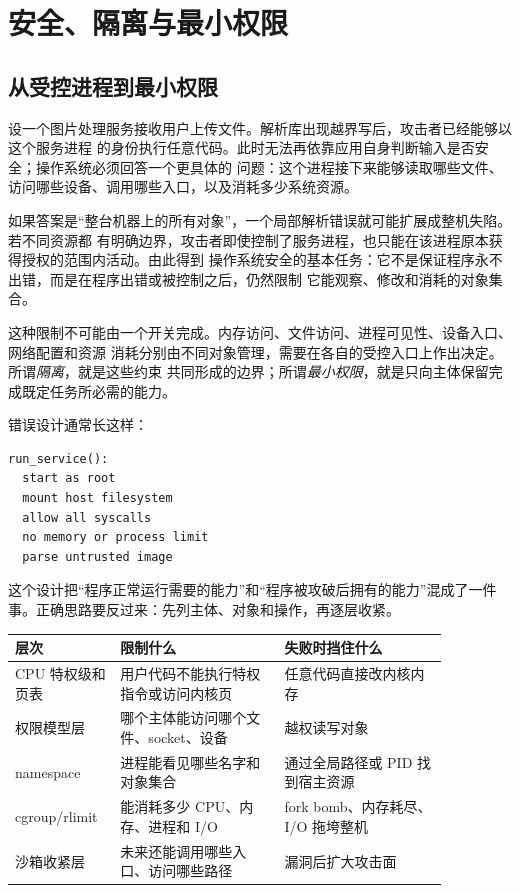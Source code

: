 \chapter{安全、隔离与最小权限}

\section{从受控进程到最小权限}

设一个图片处理服务接收用户上传文件。解析库出现越界写后，攻击者已经能够以这个服务进程
的身份执行任意代码。此时无法再依靠应用自身判断输入是否安全；操作系统必须回答一个更具体的
问题：这个进程接下来能够读取哪些文件、访问哪些设备、调用哪些入口，以及消耗多少系统资源。

如果答案是“整台机器上的所有对象”，一个局部解析错误就可能扩展成整机失陷。若不同资源都
有明确边界，攻击者即使控制了服务进程，也只能在该进程原本获得授权的范围内活动。由此得到
操作系统安全的基本任务：它不是保证程序永不出错，而是在程序出错或被控制之后，仍然限制
它能观察、修改和消耗的对象集合。

这种限制不可能由一个开关完成。内存访问、文件访问、进程可见性、设备入口、网络配置和资源
消耗分别由不同对象管理，需要在各自的受控入口上作出决定。所谓\emph{隔离}，就是这些约束
共同形成的边界；所谓\emph{最小权限}，就是只向主体保留完成既定任务所必需的能力。

错误设计通常长这样：

\begin{lstlisting}
run_service():
  start as root
  mount host filesystem
  allow all syscalls
  no memory or process limit
  parse untrusted image
\end{lstlisting}

这个设计把“程序正常运行需要的能力”和“程序被攻破后拥有的能力”混成了一件事。正确思路要反过来：先列主体、对象和操作，再逐层收紧。

\begin{longtable}{p{0.18\linewidth}p{0.34\linewidth}p{0.34\linewidth}}
\toprule
层次 & 限制什么 & 失败时挡住什么 \\
\midrule
CPU 特权级和页表 & 用户代码不能执行特权指令或访问内核页 & 任意代码直接改内核内存 \\
权限模型层 & 哪个主体能访问哪个文件、socket、设备 & 越权读写对象 \\
namespace & 进程能看见哪些名字和对象集合 & 通过全局路径或 PID 找到宿主资源 \\
cgroup/rlimit & 能消耗多少 CPU、内存、进程和 I/O & fork bomb、内存耗尽、I/O 拖垮整机 \\
沙箱收紧层 & 未来还能调用哪些入口、访问哪些路径 & 漏洞后扩大攻击面 \\
\bottomrule
\end{longtable}

